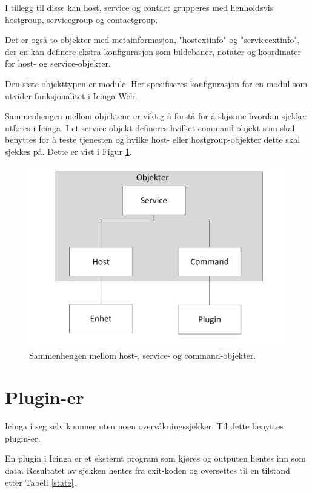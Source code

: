I tillegg til disse kan host, service og contact grupperes med henholdsvis hostgroup, servicegroup og contactgroup.

Det er også to objekter med metainformasjon, "hostextinfo" og "serviceextinfo", der en kan definere ekstra konfigurasjon som bildebaner, notater og koordinater for host- og service-objekter.

Den siste objekttypen er module. Her spesifiseres konfigurasjon for en modul som utvider funksjonalitet i Icinga Web.

Sammenhengen mellom objektene er viktig å forstå for å skjønne hvordan sjekker utføres i Icinga. I et service-objekt defineres hvilket command-objekt som skal benyttes for å teste tjenesten og hvilke host- eller hostgroup-objekter dette skal sjekkes på. Dette er vist i Figur \ref{command_host_service}.

\begin{figure}[H]
    \centering
    \includegraphics[scale=0.4]{img/command_host_service}
    \caption{Sammenhengen mellom host-, service- og command-objekter.}
    \label{command_host_service}
\end{figure}

\section{Plugin-er}
Icinga i seg selv kommer uten noen overvåkningssjekker. Til dette benyttes plugin-er.

En plugin i Icinga er et eksternt program som kjøres og outputen hentes inn som data. Resultatet av sjekken hentes fra exit-koden \cite{wiki:returncode} og oversettes til en tilstand etter Tabell \ref{state}.

